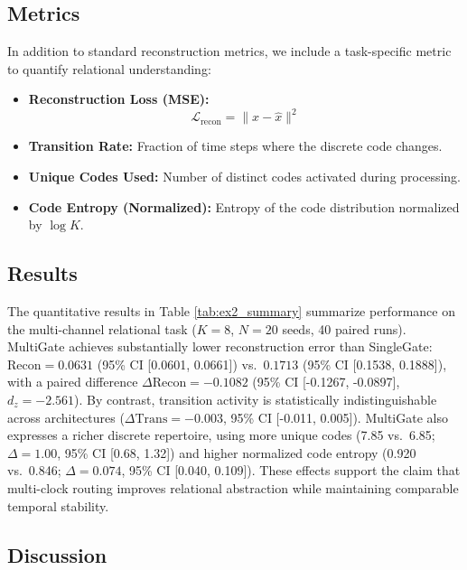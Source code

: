 \documentclass{article}
\begin{document}
\subsection{Metrics}
In addition to standard reconstruction metrics, we include a task-specific metric to quantify relational understanding:

\begin{itemize}
    \item \textbf{Reconstruction Loss (MSE):}
    \begin{equation}
        \mathcal{L}_{\text{recon}} = \|x - \hat{x}\|^2
    \end{equation}
    \item \textbf{Transition Rate:} Fraction of time steps where the discrete code changes.
    \item \textbf{Unique Codes Used:} Number of distinct codes activated during processing.
    \item \textbf{Code Entropy (Normalized):} Entropy of the code distribution normalized by $\log K$.
\end{itemize}

\subsection{Results}



The quantitative results in Table \ref{tab:ex2_summary} summarize performance on the multi-channel relational task ($K=8$, $N=20$ seeds, 40 paired runs).
MultiGate achieves substantially lower reconstruction error than SingleGate:
$\mathrm{Recon}=0.0631$ (95\% CI [0.0601, 0.0661]) vs.\ $0.1713$ (95\% CI [0.1538, 0.1888]), with a paired difference $\Delta\mathrm{Recon}=-0.1082$ (95\% CI [-0.1267, -0.0897], $d_z=-2.561$).
By contrast, transition activity is statistically indistinguishable across architectures ($\Delta\mathrm{Trans}=-0.003$, 95\% CI [-0.011, 0.005]).
MultiGate also expresses a richer discrete repertoire, using more unique codes (7.85 vs.\ 6.85; $\Delta=1.00$, 95\% CI [0.68, 1.32]) and higher normalized code entropy (0.920 vs.\ 0.846; $\Delta=0.074$, 95\% CI [0.040, 0.109]).
These effects support the claim that multi-clock routing improves relational abstraction while maintaining comparable temporal stability.

\subsection{Discussion}
\end{document}
